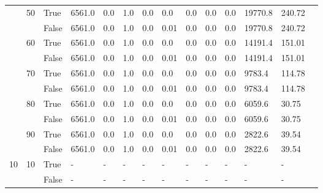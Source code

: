 \begin{appendices}
\begin{landscape}
\begin{small}
\begin{longtable}[c]{@{}lll|ll|ll|ll|ll|lll@{}}
   & 50 & True  & 6561.0          & 0.0            & 1.0           & 0.0           & 0.0           & 0.0           & 0.0           & 0.0           & 19770.8       & 240.72      &  \\
   &    & False & 6561.0          & 0.0            & 1.0           & 0.0           & 0.01          & 0.0           & 0.0           & 0.0           & 19770.8       & 240.72      &  \\
   & 60 & True  & 6561.0          & 0.0            & 1.0           & 0.0           & 0.0           & 0.0           & 0.0           & 0.0           & 14191.4       & 151.01      &  \\
   &    & False & 6561.0          & 0.0            & 1.0           & 0.0           & 0.01          & 0.0           & 0.0           & 0.0           & 14191.4       & 151.01      &  \\
   & 70 & True  & 6561.0          & 0.0            & 1.0           & 0.0           & 0.0           & 0.0           & 0.0           & 0.0           & 9783.4        & 114.78      &  \\
   &    & False & 6561.0          & 0.0            & 1.0           & 0.0           & 0.01          & 0.0           & 0.0           & 0.0           & 9783.4        & 114.78      &  \\
   & 80 & True  & 6561.0          & 0.0            & 1.0           & 0.0           & 0.0           & 0.0           & 0.0           & 0.0           & 6059.6        & 30.75       &  \\
   &    & False & 6561.0          & 0.0            & 1.0           & 0.0           & 0.01          & 0.0           & 0.0           & 0.0           & 6059.6        & 30.75       &  \\
   & 90 & True  & 6561.0          & 0.0            & 1.0           & 0.0           & 0.0           & 0.0           & 0.0           & 0.0           & 2822.6        & 39.54       &  \\
   &    & False & 6561.0          & 0.0            & 1.0           & 0.0           & 0.01          & 0.0           & 0.0           & 0.0           & 2822.6        & 39.54       &  \\
  \midrule
10 & 10 & True  & -               & -              & -             & -             & -             & -             & -             & -             & -             & -           &  \\
   &    & False & -               & -              & -             & -             & -             & -             & -             & -             & -             & -           &  \\

\end{longtable}
\end{small}
\end{landscape}
\end{appendices}
